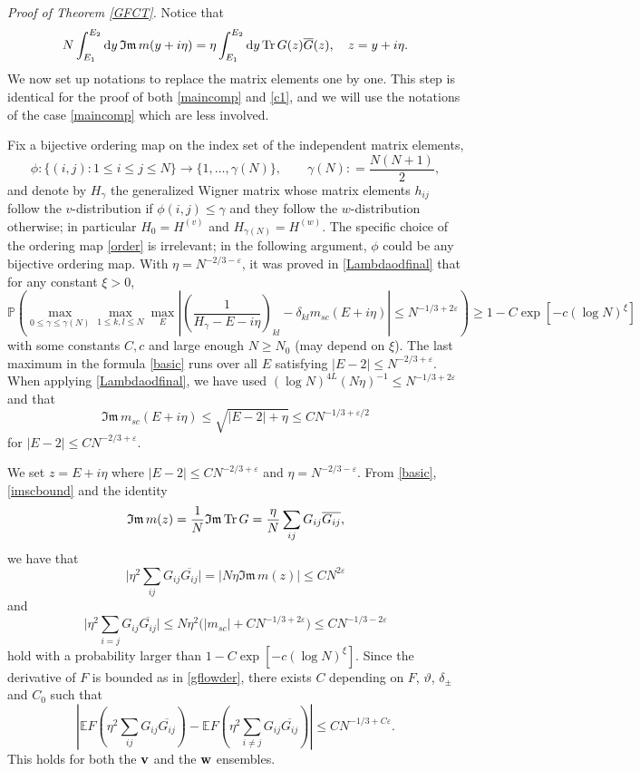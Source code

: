 \documentclass[draft]{article}
\newcommand{\ttau}{\vartheta}
\newcommand{\e}{\varepsilon}
\newcommand{\rd}{{\rm d}}
\newcommand{\tr}{\mbox{Tr\,}}
\newcommand{\bv}{{\bf{v}}}
\newcommand{\bw}{{\bf{w}}}
\newcommand{\be}{\begin{equation}}
\newcommand{\ee}{\end{equation}}
\newcommand{\ov}{\overline}
\newcommand{\im}{{\mathfrak{Im} \, }}
\newcommand{\E}{{\mathbb E }}
\renewcommand{\P}{{\mathbb P}}
\numberwithin{equation}{section}
\numberwithin{theorem}{section}
\numberwithin{definition}{section}
\numberwithin{remark}{section}
\begin{document}
\bigskip 

\noindent 
{\it Proof of Theorem \ref{GFCT}.}
Notice that 
\be\label{c2} 
N \int_{E_1}^{E_2} \rd y  \, \im m (y+i\eta ) = \eta  \int_{E_1}^{E_2} \rd y   \, \tr G(z) \ov G(z),
 \quad z = y+ i \eta .
\ee
We now set up notations to  replace the matrix elements one by one. This step is identical 
for the proof of both  \eqref{maincomp} and \eqref{c1},
 and we will use the notations of the case  \eqref{maincomp}
which are less involved. 


Fix a bijective ordering map on the index set of
the independent matrix elements,
\be\label{order}
\phi: \{(i, j): 1\le i\le  j \le N \} \to \Big\{1, \ldots, \gamma(N)\Big\} , 
\qquad \gamma(N): =\frac{N(N+1)}{2},
\ee
and denote by  $H_\gamma$  the generalized Wigner matrix whose matrix elements $h_{ij}$ follow
the $v$-distribution if $\phi(i,j)\le \gamma$ and they follow the $w$-distribution
otherwise; in particular $H_0 = H^{(v)}$ and $ H_{\gamma(N)} = H^{(w)}$.  
The specific choice of the ordering map \eqref{order} is irrelevant; in the following argument, 
 $\phi$ could be any bijective ordering map.
 With $\eta=N^{-2/3-\e}$, 
it was proved in \eqref{Lambdaodfinal} that for any constant $\xi>0$, 
\be\label{basic}
\P\left(\max_{0 \le \gamma \le \gamma(N)} \max_{1 \le k,l \le N}  
 \max_{E}\left |  \left (\frac 1 {  H_{\gamma}-E- i \eta} \right )_{k l }
 -\delta_{kl}m_{sc}(E+i \eta)
\right |\le 
N^{-1/3+2\e} \right)\geq 1-C\exp[{-c(\log N)^\xi}]
\ee
with some constants $C, c$ and large enough $N\ge N_0$ (may depend on $\xi$).
 The last maximum in the
formula \eqref{basic}
runs over all $E$ satisfying $|E-2|\le N^{-2/3+\e}$. When applying \eqref{Lambdaodfinal},
 we have used $(\log N)^{4L}(N\eta)^{-1}\leq N^{-1/3+2\e}$
and that 
\be\label{imscbound}
\im m_{sc}(E+i\eta) \le \sqrt{|E-2|+\eta}\le CN^{-1/3+\e/2}
\ee
for $|E-2|\le CN^{-2/3+\e}$.

\bigskip 
We set $z=E+i\eta$ where $|E-2|\le CN^{-2/3+\e}$ and $\eta=N^{-2/3-\e}$.
{F}rom \eqref{basic}, \eqref{imscbound} and the identity
$$
  \im m(z) = \frac{1}{N}\im \tr G=\frac{\eta}{N}\sum_{ij}G_{ij}\overline{G_{ij}},
$$
 we have that
 \be
\Big|\eta^2\sum_{ij}G_{ij}\overline{G_{ij}}\Big|=
 | N \eta \im m (z) | \leq CN^{2\e}
  \ee
  and
  \be
  \Big|\eta^2\sum_{i=j}G_{ij}\overline{G_{ij}}\Big|
  \le N\eta^2 \big( |m_{sc}| + CN^{-1/3+2\e}\big) \leq CN^{-1/3-2\e}
  \ee
hold with a probability larger than $1-C\exp[{-c(\log N)^\xi}]$. Since the derivative of $F$ 
is bounded as in \eqref{gflowder},  there exists $C$ depending on  $F$,  $\ttau$, $\delta_\pm$ 
and $C_0$ such that 
\be
\left|\E F\left(\eta^2\sum_{ij}G_{ij}\overline{G_{ij}}\right)-
\E F\left(\eta^2\sum_{i\neq j}G_{ij}\overline{G_{ij}}\right)\right|\leq CN^{-1/3+C\e}.
\ee
This holds for both the $\bv$ and the $\bw$ ensembles.
\end{document}
